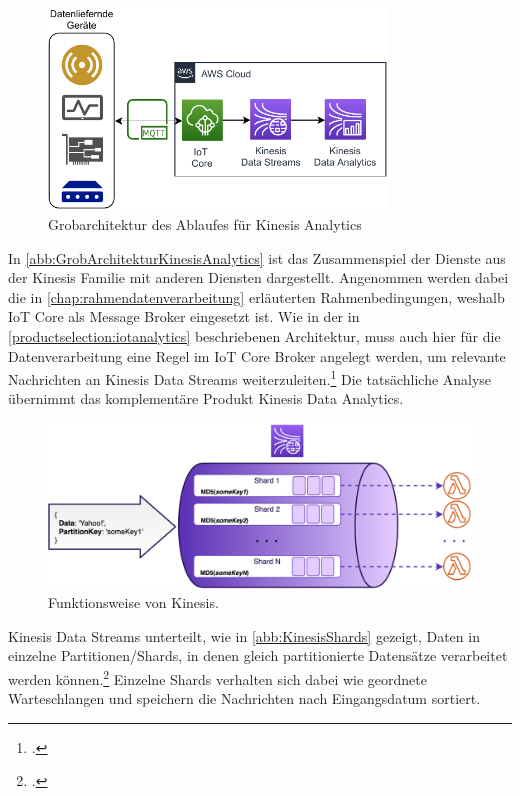 \begin{figure}[H]
\centering
\includegraphics[width=0.8\textwidth]{graphics/Kinesis-Analytics-general.pdf}
\caption{Grobarchitektur des Ablaufes für Kinesis Analytics}
\label{abb:GrobArchitekturKinesisAnalytics}
\end{figure}
In \autoref{abb:GrobArchitekturKinesisAnalytics} ist das Zusammenspiel der Dienste aus der Kinesis Familie mit anderen Diensten dargestellt. Angenommen werden dabei die in \autoref{chap:rahmendatenverarbeitung} erläuterten Rahmenbedingungen, weshalb \ac{IoT} Core als Message Broker eingesetzt ist. Wie in der in \autoref{productselection:iotanalytics} beschriebenen Architektur, muss auch hier für die Datenverarbeitung eine Regel im \ac{IoT} Core Broker angelegt werden, um relevante Nachrichten an Kinesis Data Streams weiterzuleiten.\footcite[Vgl.][]{AmazonWebServicesInc..o.J.} Die tatsächliche Analyse übernimmt das komplementäre Produkt Kinesis Data Analytics.

\begin{figure}[H]
\centering
\includegraphics[width=\textwidth]{graphics/kinesis-inner-workings.png}
\caption[Funktionsweise von Kinesis]{Funktionsweise von Kinesis.\footnotemark}
\label{abb:KinesisShards}
\end{figure}
Kinesis Data Streams unterteilt, wie in \autoref{abb:KinesisShards} gezeigt, Daten in einzelne Partitionen/Shards, in denen gleich partitionierte Datensätze verarbeitet werden können.\footcite[Vgl. auch im Folgenden][]{Pogosova.28.05.2020} Einzelne Shards verhalten sich dabei wie geordnete Warteschlangen und speichern die Nachrichten nach Eingangsdatum sortiert. 

